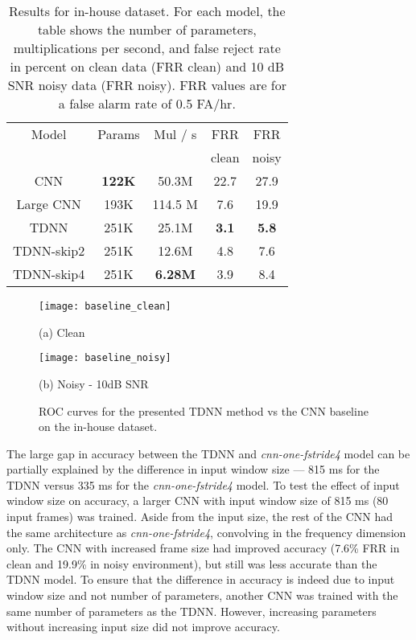 \documentclass{article}
\begin{document}
\begin{table}
	\begin{center}
		\begin{tabular}{|c||c|c|c|c| } 
			\hline
			Model & Params & Mul / s & FRR & FRR \\ 
			& & & clean & noisy \\ 
			\hline
			CNN \cite{Sainath15} & \textbf{122K} & 50.3M & 22.7 & 27.9 \\ 
            Large CNN & 193K & 114.5 M & 7.6 & 19.9 \\
			TDNN & 251K & 25.1M & \textbf{3.1} & \textbf{5.8} \\ 
			TDNN-skip2 & 251K & 12.6M & 4.8 & 7.6 \\ 
			TDNN-skip4 & 251K & \textbf{6.28M} & 3.9 & 8.4 \\ 
			\hline
		\end{tabular}
        \vspace{1em}
		\caption{Results for in-house dataset. For each model, the table shows the number of parameters, multiplications per second, and false reject rate in percent on clean data (FRR clean) and 10 dB SNR noisy data (FRR noisy). FRR values are for a false alarm rate of 0.5 FA/hr.}
		\label{tab:power}
	\end{center}
\end{table}

\begin{figure}[t]
	\begin{minipage}[b]{\linewidth}
		\centering
		\centerline{\texttt{[image: baseline\_clean]}}
\centerline{(a) Clean}\medskip
	\end{minipage}
	\hfill
	\begin{minipage}[b]{\linewidth}
		\centering
		\centerline{\texttt{[image: baseline\_noisy]}}
		\centerline{(b) Noisy - 10dB SNR}\medskip
	\end{minipage}
	\caption{ROC curves for the presented TDNN method vs the CNN baseline on the in-house dataset.}
	\label{fig:res_baseline}
\end{figure}


The large gap in accuracy between the TDNN and \textit{cnn-one-fstride4} model can be partially explained by the difference in input window size ---  815 ms for the TDNN versus 335 ms for the \textit{cnn-one-fstride4} model.  To test the effect of input window size on accuracy, a larger CNN with input window size of 815 ms (80 input frames) was trained.  Aside from the input size, the rest of the CNN had the same architecture as \textit{cnn-one-fstride4}, convolving in the frequency dimension only.  The CNN with increased frame size had improved accuracy (7.6\% FRR in clean and 19.9\% in noisy environment), but still was less accurate than the TDNN model.  To ensure that the difference in accuracy is indeed due to input window size and not number of parameters, another CNN was trained with the same number of parameters as the TDNN. However, increasing parameters without increasing input size did not improve accuracy.
\end{document}
